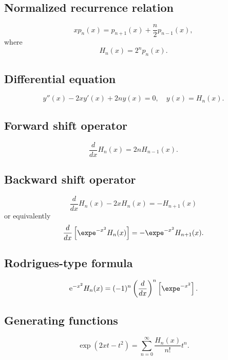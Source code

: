 \documentclass[envcountchap,graybox]{svmono}
\newcommand{\e}{\textrm{e}}
\begin{document}
\subsection*{Normalized recurrence relation}
\begin{equation}
\label{NormRecHermite}
xp_n(x)=p_{n+1}(x)+\frac{n}{2}p_{n-1}(x),
\end{equation}
where
$$H_n(x)=2^np_n(x).$$

\subsection*{Differential equation}
\begin{equation}
\label{dvHermite}
y''(x)-2xy'(x)+2ny(x)=0,\quad y(x)=H_n(x).
\end{equation}

\subsection*{Forward shift operator}
\begin{equation}
\label{shift1Hermite}
\frac{d}{dx}H_n(x)=2nH_{n-1}(x).
\end{equation}

\subsection*{Backward shift operator}
\begin{equation}
\label{shift2HermiteI}
\frac{d}{dx}H_n(x)-2xH_n(x)=-H_{n+1}(x)
\end{equation}
or equivalently
\begin{equation}
\label{shift2HermiteII}
\frac{d}{dx}\left[\expe^{-x^2}H_n(x)\right]=-\expe^{-x^2}H_{n+1}(x).
\end{equation}

\subsection*{Rodrigues-type formula}
\begin{equation}
\label{RodHermite}
\e^{-x^2}H_n(x)=(-1)^n\left(\frac{d}{dx}\right)^n\left[\expe^{-x^2}\right].
\end{equation}

\subsection*{Generating functions}
\begin{equation}
\label{GenHermite1}
\exp\left(2xt-t^2\right)=\sum_{n=0}^{\infty}\frac{H_n(x)}{n!}t^n.
\end{equation}
\end{document}
